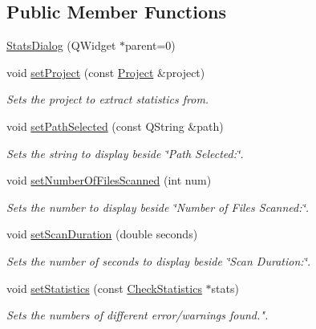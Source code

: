 \subsection*{Public Member Functions}
\begin{DoxyCompactItemize}
\item 
\hyperlink{class_stats_dialog_ae6a4b781eacb16f0c5ff37c9574c9d6b}{Stats\-Dialog} (Q\-Widget $\ast$parent=0)
\item 
void \hyperlink{class_stats_dialog_a214a0c5aa5c624df7b33b57e8e4b36a2}{set\-Project} (const \hyperlink{class_project}{Project} \&project)
\begin{DoxyCompactList}\small\item\em Sets the project to extract statistics from. \end{DoxyCompactList}\item 
void \hyperlink{class_stats_dialog_abf337d58d882503d10d18bf33007d2ac}{set\-Path\-Selected} (const Q\-String \&path)
\begin{DoxyCompactList}\small\item\em Sets the string to display beside \char`\"{}\-Path Selected\-:\char`\"{}. \end{DoxyCompactList}\item 
void \hyperlink{class_stats_dialog_a3664390ff1907d25f9f915ddf0e2388b}{set\-Number\-Of\-Files\-Scanned} (int num)
\begin{DoxyCompactList}\small\item\em Sets the number to display beside \char`\"{}\-Number of Files Scanned\-:\char`\"{}. \end{DoxyCompactList}\item 
void \hyperlink{class_stats_dialog_a010c061a40ee96612c55c71eb3f656ee}{set\-Scan\-Duration} (double seconds)
\begin{DoxyCompactList}\small\item\em Sets the number of seconds to display beside \char`\"{}\-Scan Duration\-:\char`\"{}. \end{DoxyCompactList}\item 
void \hyperlink{class_stats_dialog_ab99a7a4325c9811b6281f32e05f68680}{set\-Statistics} (const \hyperlink{class_check_statistics}{Check\-Statistics} $\ast$stats)
\begin{DoxyCompactList}\small\item\em Sets the numbers of different error/warnings found.". \end{DoxyCompactList}\end{DoxyCompactItemize}


